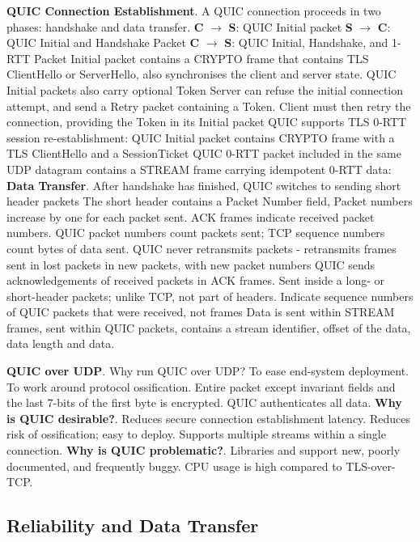 \documentclass{article}
\begin{document}
\vspace{\baselineskip}
\textbf{QUIC Connection Establishment}. A QUIC connection proceeds in two phases: handshake and data transfer.
\textbf{C} $\rightarrow$ \textbf{S}: QUIC Initial packet
\textbf{S} $\rightarrow$ \textbf{C}: QUIC Initial and Handshake Packet
\textbf{C} $\rightarrow$ \textbf{S}: QUIC Initial, Handshake, and 1-RTT Packet
Initial packet contains a CRYPTO frame that contains TLS ClientHello or ServerHello, also synchronises the client and server state.
QUIC Initial packets also carry optional Token Server can refuse the initial connection attempt,
and send a Retry packet containing a Token.
Client must then retry the connection, providing the Token in its Initial packet
QUIC supports TLS 0-RTT session re-establishment: QUIC Initial packet contains CRYPTO frame with a TLS ClientHello
and a SessionTicket QUIC 0-RTT packet included in the same UDP datagram contains a STREAM frame carrying idempotent 0-RTT data:
\textbf{Data Transfer}. After handshake has finished, QUIC switches to sending short header packets
The short header contains a Packet Number field, Packet numbers increase by one for each packet sent.
ACK frames indicate received packet numbers. QUIC packet numbers count packets sent; TCP sequence numbers count bytes of data sent.
QUIC never retransmits packets {-} retransmits frames sent in lost packets in new packets, with new packet numbers
QUIC sends acknowledgements of received packets in ACK frames.
Sent inside a long- or short-header packets; unlike TCP, not part of headers.
Indicate sequence numbers of QUIC packets that were received, not frames
Data is sent within STREAM frames, sent within QUIC packets, contains a stream identifier, offset of the data, data length and data.

\vspace{\baselineskip}
\textbf{QUIC over UDP}. Why run QUIC over UDP\@? To ease end-system deployment.
To work around protocol ossification.
Entire packet except invariant fields and the last 7-bits of the first byte is encrypted.
QUIC authenticates all data.
\textbf{Why is QUIC desirable?}.
Reduces secure connection establishment latency.
Reduces risk of ossification; easy to deploy.
Supports multiple streams within a single connection.
\textbf{Why is QUIC problematic?}.
Libraries and support new, poorly documented, and frequently buggy.
CPU usage is high compared to TLS-over-TCP\@.

\clearpage

\subsection*{Reliability and Data Transfer}
\end{document}
